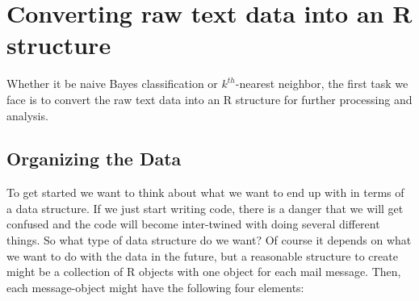 \section{Converting raw text data into an R structure}
Whether it be naive Bayes classification or $k^{th}$-nearest
neighbor, the first task we face is to convert the raw text data into 
an R structure for further processing and analysis.

\subsection{Organizing the Data}
To get started we want to think about what we want to end up with
in terms of a data structure. 
If we just start writing code, there is a
danger that we will get confused and the code will become inter-twined
with doing several different things.  
So what type of data structure do we want?
Of course it depends on what we want to do with the data in the future, 
but a reasonable structure to create might be a
collection of R objects with one object for each mail message.  
Then, each message-object might have the following four elements: 

